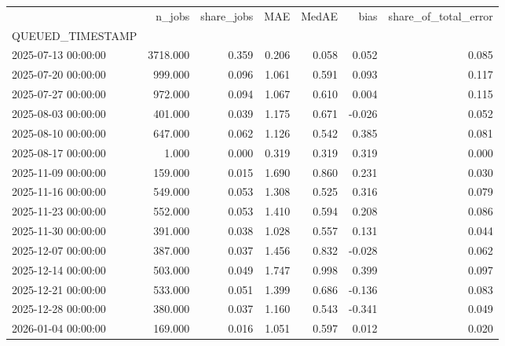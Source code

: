 \begin{tabular}{lrrrrrr}
\toprule
 & n_jobs & share_jobs & MAE & MedAE & bias & share_of_total_error \\
QUEUED_TIMESTAMP &  &  &  &  &  &  \\
\midrule
2025-07-13 00:00:00 & 3718.000 & 0.359 & 0.206 & 0.058 & 0.052 & 0.085 \\
2025-07-20 00:00:00 & 999.000 & 0.096 & 1.061 & 0.591 & 0.093 & 0.117 \\
2025-07-27 00:00:00 & 972.000 & 0.094 & 1.067 & 0.610 & 0.004 & 0.115 \\
2025-08-03 00:00:00 & 401.000 & 0.039 & 1.175 & 0.671 & -0.026 & 0.052 \\
2025-08-10 00:00:00 & 647.000 & 0.062 & 1.126 & 0.542 & 0.385 & 0.081 \\
2025-08-17 00:00:00 & 1.000 & 0.000 & 0.319 & 0.319 & 0.319 & 0.000 \\
2025-11-09 00:00:00 & 159.000 & 0.015 & 1.690 & 0.860 & 0.231 & 0.030 \\
2025-11-16 00:00:00 & 549.000 & 0.053 & 1.308 & 0.525 & 0.316 & 0.079 \\
2025-11-23 00:00:00 & 552.000 & 0.053 & 1.410 & 0.594 & 0.208 & 0.086 \\
2025-11-30 00:00:00 & 391.000 & 0.038 & 1.028 & 0.557 & 0.131 & 0.044 \\
2025-12-07 00:00:00 & 387.000 & 0.037 & 1.456 & 0.832 & -0.028 & 0.062 \\
2025-12-14 00:00:00 & 503.000 & 0.049 & 1.747 & 0.998 & 0.399 & 0.097 \\
2025-12-21 00:00:00 & 533.000 & 0.051 & 1.399 & 0.686 & -0.136 & 0.083 \\
2025-12-28 00:00:00 & 380.000 & 0.037 & 1.160 & 0.543 & -0.341 & 0.049 \\
2026-01-04 00:00:00 & 169.000 & 0.016 & 1.051 & 0.597 & 0.012 & 0.020 \\
\bottomrule
\end{tabular}
